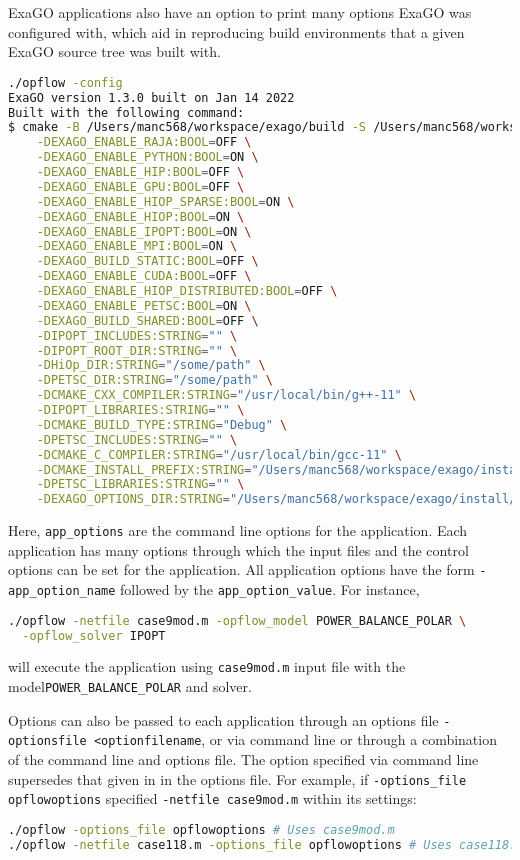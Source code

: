 ExaGO applications also have an option to print many options ExaGO was configured with, which aid in reproducing build environments that a given ExaGO source tree was built with.

\begin{lstlisting}[language=bash]
./opflow -config
ExaGO version 1.3.0 built on Jan 14 2022
Built with the following command:
$ cmake -B /Users/manc568/workspace/exago/build -S /Users/manc568/workspace/exago \
	-DEXAGO_ENABLE_RAJA:BOOL=OFF \
	-DEXAGO_ENABLE_PYTHON:BOOL=ON \
	-DEXAGO_ENABLE_HIP:BOOL=OFF \
	-DEXAGO_ENABLE_GPU:BOOL=OFF \
	-DEXAGO_ENABLE_HIOP_SPARSE:BOOL=ON \
	-DEXAGO_ENABLE_HIOP:BOOL=ON \
	-DEXAGO_ENABLE_IPOPT:BOOL=ON \
	-DEXAGO_ENABLE_MPI:BOOL=ON \
	-DEXAGO_BUILD_STATIC:BOOL=OFF \
	-DEXAGO_ENABLE_CUDA:BOOL=OFF \
	-DEXAGO_ENABLE_HIOP_DISTRIBUTED:BOOL=OFF \
	-DEXAGO_ENABLE_PETSC:BOOL=ON \
	-DEXAGO_BUILD_SHARED:BOOL=OFF \
	-DIPOPT_INCLUDES:STRING="" \
	-DIPOPT_ROOT_DIR:STRING="" \
	-DHiOp_DIR:STRING="/some/path" \
	-DPETSC_DIR:STRING="/some/path" \
	-DCMAKE_CXX_COMPILER:STRING="/usr/local/bin/g++-11" \
	-DIPOPT_LIBRARIES:STRING="" \
	-DCMAKE_BUILD_TYPE:STRING="Debug" \
	-DPETSC_INCLUDES:STRING="" \
	-DCMAKE_C_COMPILER:STRING="/usr/local/bin/gcc-11" \
	-DCMAKE_INSTALL_PREFIX:STRING="/Users/manc568/workspace/exago/install" \
	-DPETSC_LIBRARIES:STRING="" \
	-DEXAGO_OPTIONS_DIR:STRING="/Users/manc568/workspace/exago/install/share/exago/options"
\end{lstlisting}

Here, \lstinline{app_options} are the command line options for the application. Each application has many options through which the input files and the control options can be set for the application. All application options have the form \lstinline{-app_option_name} followed by the \lstinline{app_option_value}. 
For instance,
\begin{lstlisting}[language=bash]
  ./opflow -netfile case9mod.m -opflow_model POWER_BALANCE_POLAR \
  -opflow_solver IPOPT
\end{lstlisting}
will execute the \opflow application using \lstinline{case9mod.m} input file
with the model\newline \lstinline{POWER_BALANCE_POLAR} and \ipopt solver.

Options can also be passed to each application through an options file \lstinline{-optionsfile <optionfilename}, or via command line or through a combination of the command line and options file. The option specified via command line supersedes that given in in the options file. For example, if \lstinline{-options_file opflowoptions} specified \lstinline{-netfile case9mod.m} within its settings:
\begin{lstlisting}[language=bash]
./opflow -options_file opflowoptions # Uses case9mod.m
./opflow -netfile case118.m -options_file opflowoptions # Uses case118.m
\end{lstlisting}
